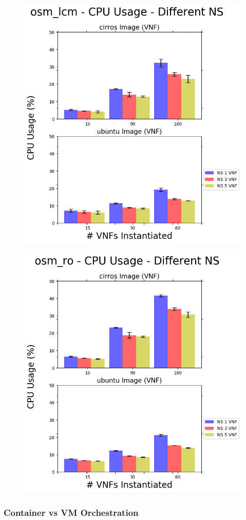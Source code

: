 \begin{figure}[h]
	\centering
	\includegraphics[width=0.7\linewidth]{figures/scalability_graphs/Docker-Grouped-Cases/osm/osm_lcm-Mean-CPU-Cases}
	\caption{}
	\label{fig:osmlcm-mean-cpu-cases}
\end{figure}

\begin{figure}[h]
	\centering
	\includegraphics[width=0.7\linewidth]{figures/scalability_graphs/Docker-Grouped-Cases/osm/osm_ro-Mean-CPU-Cases}
	\caption{}
	\label{fig:osmro-mean-cpu-cases}
\end{figure}


\subsubsection{Container vs VM Orchestration} 

